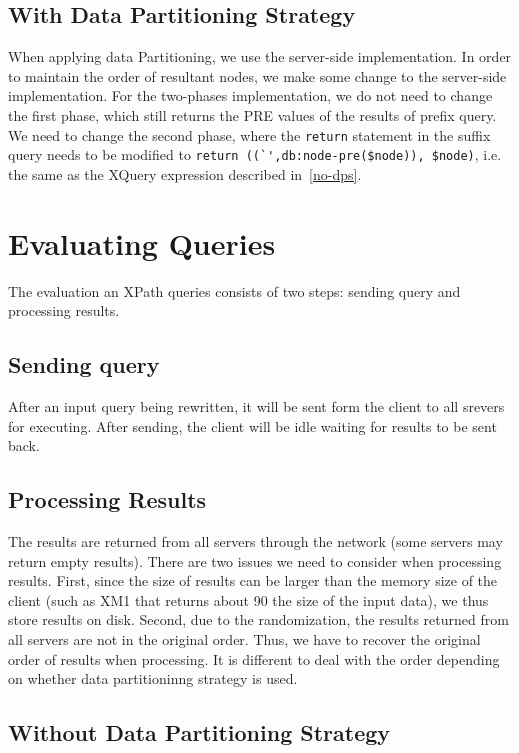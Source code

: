 \subsection{With Data Partitioning Strategy}

When applying data Partitioning, we use the server-side implementation. In
order to maintain the order of resultant nodes, we make some change to the
server-side implementation. For the two-phases implementation, we do not need to
change the first phase, which still returns the PRE values of the results of
prefix query. We need to change the second phase, where the \verb|return|
statement in the suffix query needs to be modified to 
\verb|return ((`',db:node-pre($node)), $node)|, 
i.e. the same as the XQuery expression described in~\ref{no-dps}.

 

\section{Evaluating Queries}

The evaluation an XPath queries consists of two steps: sending query and
processing results.

\subsection{Sending query}

After an input query being rewritten, it will be sent form the client to all
srevers for executing. After sending, the client will be idle waiting for
results to be sent back.

\subsection{Processing Results}

The results are returned from all servers through the network (some servers may
return empty results). There are two issues we need to consider when processing
results. First, since the size of results can be larger than the memory size of
the client (such as XM1 that returns about 90 the size of the input data), we
thus store results on disk. Second, due to the randomization, the results
returned from all servers are not in the original order. Thus, we have to
recover the original order of results when processing. It is different to deal
with the order depending on whether data partitioninng strategy is used.

\subsection{Without Data Partitioning Strategy}

